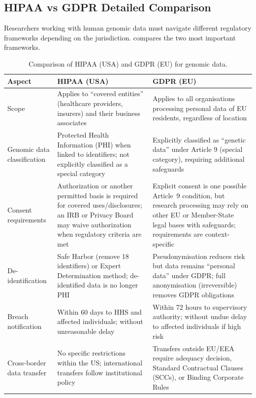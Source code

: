 \subsection{HIPAA vs GDPR Detailed Comparison}
\label{subsec:datastandards:hipaa-gdpr}

Researchers working with human genomic data must navigate different regulatory frameworks depending on the jurisdiction.  compares the two most important frameworks.

\begin{table}[htbp]
\centering
\caption{Comparison of HIPAA (USA) and GDPR (EU) for genomic data.}
\label{tab:hipaa-gdpr}
\small
\renewcommand{\arraystretch}{1.3}
\begin{tabularx}{\textwidth}{@{}l X X@{}}
\toprule
\textbf{Aspect} & \textbf{HIPAA (USA)} & \textbf{GDPR (EU)} \\
\midrule
Scope & Applies to ``covered entities'' (healthcare providers, insurers) and their business associates & Applies to all organisations processing personal data of EU residents, regardless of location \\
\addlinespace
Genomic data classification & Protected Health Information (PHI) when linked to identifiers; not explicitly classified as a special category & Explicitly classified as ``genetic data'' under Article 9 (special category), requiring additional safeguards \\
\addlinespace
Consent requirements & Authorization or another permitted basis is required for covered uses/disclosures; an IRB or Privacy Board may waive authorization when regulatory criteria are met & Explicit consent is one possible Article~9 condition, but research processing may rely on other EU or Member-State legal bases with safeguards; requirements are context-specific \\
\addlinespace
De-identification & Safe Harbor (remove 18 identifiers) or Expert Determination method; de-identified data is no longer PHI & Pseudonymisation reduces risk but data remains ``personal data'' under GDPR; full anonymisation (irreversible) removes GDPR obligations \\
\addlinespace
Breach notification & Within 60 days to HHS and affected individuals; without unreasonable delay & Within 72 hours to supervisory authority; without undue delay to affected individuals if high risk \\
\addlinespace
Cross-border data transfer & No specific restrictions within the US; international transfers follow institutional policy & Transfers outside EU/EEA require adequacy decision, Standard Contractual Clauses (SCCs), or Binding Corporate Rules \\

\end{tabularx}
\end{table}
